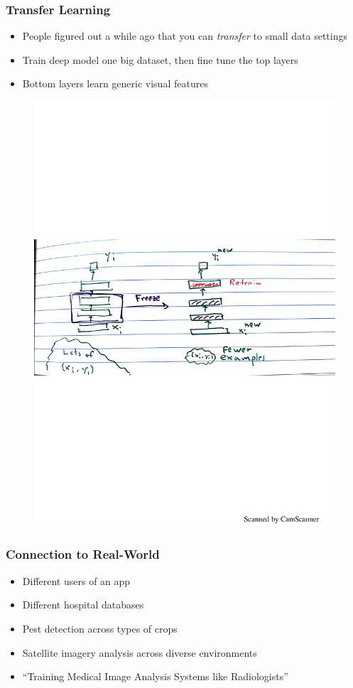 \documentclass[10pt,mathserif]{beamer}
\begin{document}
\begin{frame}
  \frametitle{Transfer Learning}
  \begin{itemize}\itemsep=12pt
  \item People figured out a while ago that you can \textit{transfer} to small
    data settings
  \item Train deep model one big dataset, then fine tune the top layers
  \item Bottom layers learn generic visual features
  \end{itemize}
  \begin{figure}
    \includegraphics[width=0.6\paperwidth]{figure/transfer_drawing}
  \end{figure}
\end{frame}

\begin{frame}
  \frametitle{Connection to Real-World}
  \begin{itemize}
  \item Different users of an app
  \item Different hospital databases
  \item Pest detection across types of crops
  \item Satellite imagery analysis across diverse environments
  \item ``Training Medical Image Analysis Systems like Radiologists'' \citep{maicas2018training}
  \end{itemize}
\end{frame}
\end{document}
